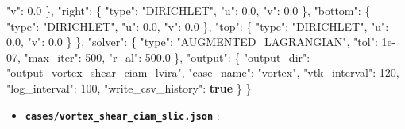 \documentclass[
  10pt,
]{article}
\newenvironment{Shaded}{}{}
\newcommand{\DataTypeTok}[1]{\textcolor[rgb]{0.56,0.13,0.00}{#1}}
\newcommand{\DecValTok}[1]{\textcolor[rgb]{0.25,0.63,0.44}{#1}}
\newcommand{\FloatTok}[1]{\textcolor[rgb]{0.25,0.63,0.44}{#1}}
\newcommand{\FunctionTok}[1]{\textcolor[rgb]{0.02,0.16,0.49}{#1}}
\newcommand{\KeywordTok}[1]{\textcolor[rgb]{0.00,0.44,0.13}{\textbf{#1}}}
\newcommand{\StringTok}[1]{\textcolor[rgb]{0.25,0.44,0.63}{#1}}
\providecommand{\tightlist}{%
  \setlength{\itemsep}{0pt}\setlength{\parskip}{0pt}}
\begin{document}
\begin{Shaded}
\begin{Highlighting}[]
      \DataTypeTok{"v"}\FunctionTok{:} \FloatTok{0.0}
    \FunctionTok{\},}
    \DataTypeTok{"right"}\FunctionTok{:} \FunctionTok{\{}
      \DataTypeTok{"type"}\FunctionTok{:} \StringTok{"DIRICHLET"}\FunctionTok{,}
      \DataTypeTok{"u"}\FunctionTok{:} \FloatTok{0.0}\FunctionTok{,}
      \DataTypeTok{"v"}\FunctionTok{:} \FloatTok{0.0}
    \FunctionTok{\},}
    \DataTypeTok{"bottom"}\FunctionTok{:} \FunctionTok{\{}
      \DataTypeTok{"type"}\FunctionTok{:} \StringTok{"DIRICHLET"}\FunctionTok{,}
      \DataTypeTok{"u"}\FunctionTok{:} \FloatTok{0.0}\FunctionTok{,}
      \DataTypeTok{"v"}\FunctionTok{:} \FloatTok{0.0}
    \FunctionTok{\},}
    \DataTypeTok{"top"}\FunctionTok{:} \FunctionTok{\{}
      \DataTypeTok{"type"}\FunctionTok{:} \StringTok{"DIRICHLET"}\FunctionTok{,}
      \DataTypeTok{"u"}\FunctionTok{:} \FloatTok{0.0}\FunctionTok{,}
      \DataTypeTok{"v"}\FunctionTok{:} \FloatTok{0.0}
    \FunctionTok{\}}
  \FunctionTok{\},}
  \DataTypeTok{"solver"}\FunctionTok{:} \FunctionTok{\{}
    \DataTypeTok{"type"}\FunctionTok{:} \StringTok{"AUGMENTED\_LAGRANGIAN"}\FunctionTok{,}
    \DataTypeTok{"tol"}\FunctionTok{:} \DecValTok{1e{-}07}\FunctionTok{,}
    \DataTypeTok{"max\_iter"}\FunctionTok{:} \DecValTok{500}\FunctionTok{,}
    \DataTypeTok{"r\_al"}\FunctionTok{:} \FloatTok{500.0}
  \FunctionTok{\},}
  \DataTypeTok{"output"}\FunctionTok{:} \FunctionTok{\{}
    \DataTypeTok{"output\_dir"}\FunctionTok{:} \StringTok{"output\_vortex\_shear\_ciam\_lvira"}\FunctionTok{,}
    \DataTypeTok{"case\_name"}\FunctionTok{:} \StringTok{"vortex"}\FunctionTok{,}
    \DataTypeTok{"vtk\_interval"}\FunctionTok{:} \DecValTok{120}\FunctionTok{,}
    \DataTypeTok{"log\_interval"}\FunctionTok{:} \DecValTok{100}\FunctionTok{,}
    \DataTypeTok{"write\_csv\_history"}\FunctionTok{:} \KeywordTok{true}
  \FunctionTok{\}}
\FunctionTok{\}}
\end{Highlighting}
\end{Shaded}

\begin{itemize}
\tightlist
\item
  \textbf{\texttt{cases/vortex\_shear\_ciam\_slic.json}} :
\end{itemize}
\end{document}
